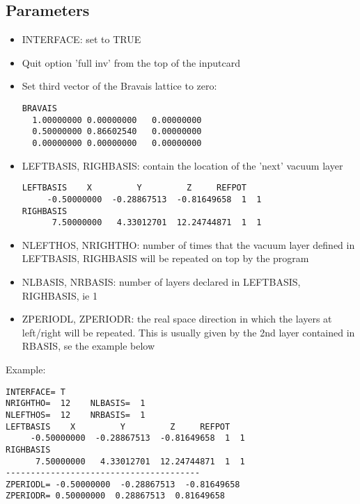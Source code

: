 \documentclass[a4paper,10pt,fullpage]{report}
\begin{document}
\subsection{Parameters}

\begin{itemize}

\item INTERFACE: set to TRUE

\item Quit option 'full inv' from the top of the inputcard

\item Set third vector of the Bravais lattice to zero:

\begin{verbatim}
BRAVAIS
  1.00000000 0.00000000   0.00000000
  0.50000000 0.86602540   0.00000000
  0.00000000 0.00000000   0.00000000
\end{verbatim}

\item LEFTBASIS, RIGHBASIS: contain the location of the 'next' vacuum layer
\begin{verbatim}
LEFTBASIS    X         Y         Z     REFPOT
     -0.50000000  -0.28867513  -0.81649658  1  1
RIGHBASIS
      7.50000000   4.33012701  12.24744871  1  1
\end{verbatim}

\item NLEFTHOS, NRIGHTHO: number of times that the vacuum layer defined in 
LEFTBASIS, RIGHBASIS will be repeated on top by the program

\item NLBASIS, NRBASIS: number of layers declared in LEFTBASIS, RIGHBASIS, ie 1

\item ZPERIODL, ZPERIODR: the real space direction in which the layers at
left/right will be repeated. This is usually given by the 2nd layer contained in RBASIS,
se the example below
\end{itemize}
Example:
\begin{verbatim}
INTERFACE= T
NRIGHTHO=  12    NLBASIS=  1
NLEFTHOS=  12    NRBASIS=  1
LEFTBASIS    X         Y         Z     REFPOT
     -0.50000000  -0.28867513  -0.81649658  1  1
RIGHBASIS
      7.50000000   4.33012701  12.24744871  1  1
---------------------------------------
ZPERIODL= -0.50000000  -0.28867513  -0.81649658
ZPERIODR= 0.50000000  0.28867513  0.81649658
\end{verbatim}
\end{document}

